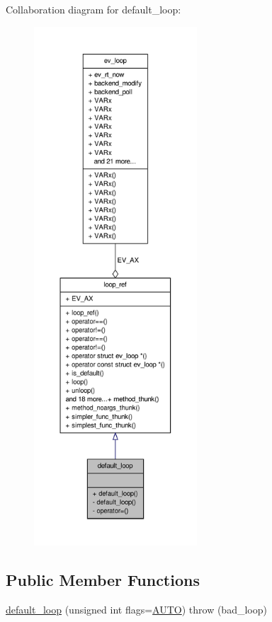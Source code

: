 \-Collaboration diagram for default\-\_\-loop\-:
\nopagebreak
\begin{figure}[H]
\begin{center}
\leavevmode
\includegraphics[height=550pt]{structev_1_1default__loop__coll__graph}
\end{center}
\end{figure}
\subsection*{\-Public \-Member \-Functions}
\begin{DoxyCompactItemize}
\item 
\hyperlink{structev_1_1default__loop_a3269f4b0cc758d91739d8184956b0461}{default\-\_\-loop} (unsigned int flags=\hyperlink{namespaceev_adf764cbdea00d65edcd07bb9953ad2b7aeef9468d1b98bca652a04bf5063fd9d6}{\-A\-U\-T\-O})  throw (bad\-\_\-loop)
\end{DoxyCompactItemize}
